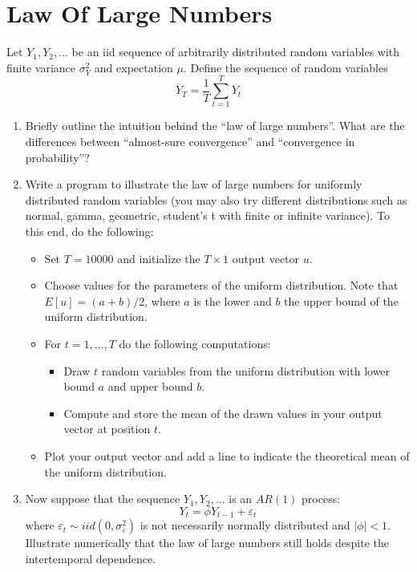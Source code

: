 \section[Law Of Large Numbers]{Law Of Large Numbers\label{ex:LawOfLargeNumbers}}
Let \(Y_{1},Y_{2},\ldots \) be an iid sequence of arbitrarily distributed random variables
  with finite variance \(\sigma_Y ^{2}\) and expectation \(\mu \).
Define the sequence of random variables
\begin{equation*}
\overline{Y}_{T}=\frac{1}{T}\sum_{t=1}^{T}Y_{t}
\end{equation*}
\begin{enumerate}

\item
Briefly outline the intuition behind the \enquote{law of large numbers}.
What are the differences between \enquote{almost-sure convergence}
  and \enquote{convergence in probability}?

\item Write a program to illustrate the law of large numbers for uniformly distributed random variables
  (you may also try different distributions such as normal, gamma, geometric, student's t with finite or infinite variance).
To this end, do the following:
\begin{itemize}
  \item
  Set \(T=10000\) and initialize the \(T \times 1\) output vector \(u\).

  \item
  Choose values for the parameters of the uniform distribution.
  Note that \(E[u] = (a+b)/2\), where \(a\) is the lower and \(b\) the upper bound of the uniform distribution.

  \item
  For \(t=1,\ldots,T\) do the following computations:
  \begin{itemize}
    \item
    Draw \(t\) random variables from the uniform distribution with lower bound \(a\) and upper bound \(b\).
    \item
    Compute and store the mean of the drawn values in your output vector at position \(t\).
  \end{itemize}

  \item
  Plot your output vector and add a line to indicate the theoretical mean of the uniform distribution.
\end{itemize}

\item
Now suppose that the sequence \(Y_{1},Y_{2},\ldots \) is an \(AR(1)\) process:
\[Y_{t} =\phi Y_{t-1} +\varepsilon _{t}\]
where \(\varepsilon _{t}\sim iid(0,\sigma _{\varepsilon }^{2})\) is not necessarily normally distributed and \(|\phi |<1\).
Illustrate numerically that the law of large numbers still holds despite the intertemporal dependence.
\end{enumerate}

